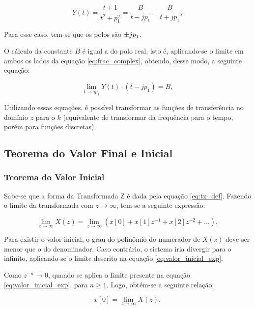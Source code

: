 \begin{equation}
Y(t)=\frac{t+1}{t^2+p_1^2}=\frac{B}{t - jp_1}+\frac{\overline{B}}{t + jp_1},
\label{eq:frac_complex}
\end{equation}

Para esse caso, tem-se que os polos são \( \pm \space jp_1 \).

O cálculo da constante \( B \) é igual a do polo real, isto é, aplicando-se o limite em ambos os lados da equação \ref{eq:frac_complex}, obtendo, desse modo, a seguinte equação:

\begin{equation}
\lim_{t \to jp_1} Y(t)\cdot (t - jp_1) = B,
\label{eq:lim_complex}
\end{equation}

Utilizando essas equações, é possível transformar as funções de transferência no domínio \( z \) para o \( k \) (equivalente de transformar da frequência para o tempo, porém para funções discretas). 

\subsection{Teorema do Valor Final e Inicial}
\label{teorema_valor_in.fin}
\subsubsection{Teorema do Valor Inicial}

Sabe-se que a forma da Transformada Z é dada pela equação \ref{eq:tz_def}.
Fazendo o limite da transformada com \( z \to \infty \), tem-se a seguinte expressão:

\begin{equation}
\lim_{z \to \infty}X(z) = \lim_{z \to \infty}(x[0] + x[1]z^{-1} + x[2]z^{-2} + \ldots),
\label{eq:valor_inicial_exp}
\end{equation}

Para existir o valor inicial, o grau do polinômio do numerador de \( X(z) \) deve ser menor que o do denominador. Caso contrário, o sistema iria divergir para o infinito, aplicando-se o limite descrito na equação \ref{eq:valor_inicial_exp}.

Como \( z^{-n} \to 0 \), quando se aplica o limite presente na equação \ref{eq:valor_inicial_exp}, para \( n \geqslant 1 \). Logo, obtém-se a seguinte relação:

\begin{equation}
x[0] = \lim_{z \to \infty}X(z),
\label{eq:valor_inicial}
\end{equation}

